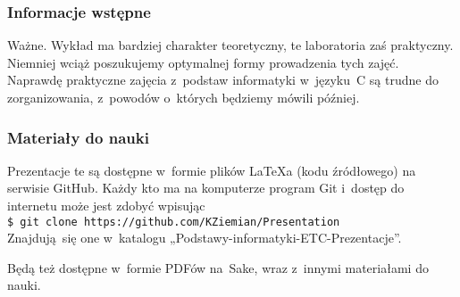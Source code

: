 \documentclass[10pt,t]{beamer}
\begin{document}
\begin{frame}
  \frametitle{Informacje wstępne}







  \alert{Ważne.} Wykład ma bardziej charakter teoretyczny, te laboratoria
  zaś praktyczny. Niemniej wciąż poszukujemy optymalnej formy prowadzenia
  tych zajęć. Naprawdę praktyczne zajęcia z~podstaw informatyki w~języku~C
  są trudne do zorganizowania, z~powodów o~których będziemy mówili
  później.

\end{frame}





\begin{frame}
  \frametitle{Materiały do nauki}


  Prezentacje te są dostępne w~formie plików \LaTeX a (kodu źródłowego)
  na serwisie GitHub. Każdy kto ma na komputerze program Git i~dostęp
  do internetu może jest zdobyć wpisując \\
  \texttt{\$ git clone https://github.com/KZiemian/Presentation} \\
  Znajdują~się one w~katalogu „Podstawy-informatyki-ETC-Prezentacje”.

  Będą też dostępne w~formie PDFów na~Sake, wraz z~innymi materiałami
  do nauki.

\end{frame}
\end{document}
